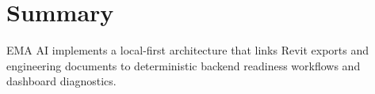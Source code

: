 \section*{Summary}
EMA AI implements a local-first architecture that links Revit exports and engineering documents to deterministic backend readiness workflows and dashboard diagnostics.

